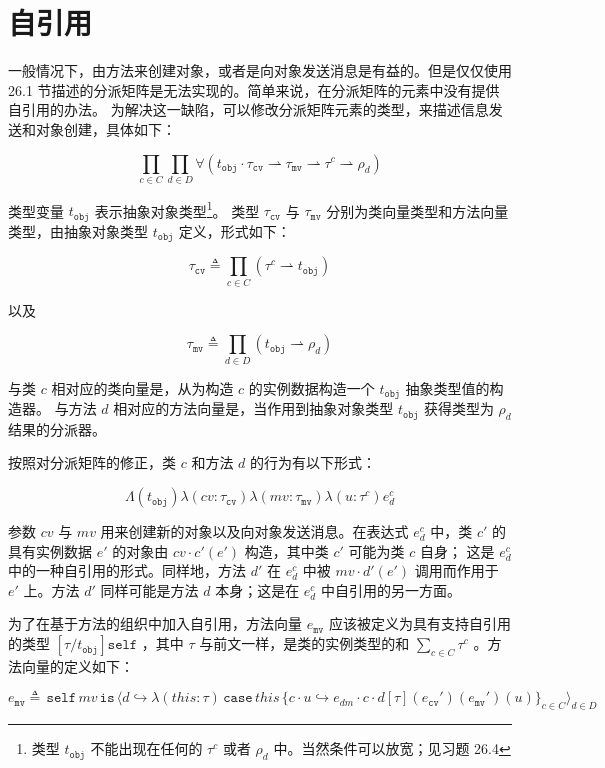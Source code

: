 \section{自引用}

一般情况下，由方法来创建对象，或者是向对象发送消息是有益的。但是仅仅使用 26.1 节描述的分派矩阵是无法实现的。简单来说，在分派矩阵的元素中没有提供自引用的办法。
为解决这一缺陷，可以修改分派矩阵元素的类型，来描述信息发送和对象创建，具体如下：

$$ \prod_{c \in C} \prod_{d \in D} \forall (t_{\mathtt{obj}} \cdot \tau_{\mathtt{cv}} \rightharpoonup \tau_{\mathtt{mv}} \rightharpoonup \tau^{c} \rightharpoonup \rho_{d})$$

类型变量 $t_{\mathtt{obj}}$ 表示抽象对象类型\footnote[2]{类型 $t_{\mathtt{obj}}$ 不能出现在任何的 $\tau^{c}$ 或者 $\rho_{d}$ 中。当然条件可以放宽；见习题 26.4}。
类型 $\tau_{\mathtt{cv}}$ 与 $\tau_{\mathtt{mv}}$ 分别为类向量类型和方法向量类型，由抽象对象类型 $t_{\mathtt{obj}}$ 定义，形式如下：

$$ \tau_{\mathtt{cv}} \triangleq \prod_{c \in C}(\tau^{c} \rightharpoonup t_{\mathtt{obj}}) $$

以及

$$ \tau_{\mathtt{mv}} \triangleq \prod_{d \in D}(t_{\mathtt{obj}} \rightharpoonup \rho_{d}) $$

与类 $c$ 相对应的类向量是，从为构造 $c$ 的实例数据构造一个 $t_{\mathtt{obj}}$ 抽象类型值的构造器。
与方法 $d$ 相对应的方法向量是，当作用到抽象对象类型 $t_{\mathtt{obj}}$ 获得类型为 $\rho_{d}$ 结果的分派器。

按照对分派矩阵的修正，类 $c$ 和方法 $d$ 的行为有以下形式：

$$ \Lambda(t_{\mathtt{obj}})\lambda(cv : \tau_{\mathtt{cv}}) \lambda (mv : \tau_{\mathtt{mv}}) \lambda (u : \tau^{c})e^{c}_{d}$$

参数 $cv$ 与 $mv$ 用来创建新的对象以及向对象发送消息。在表达式 $e^{c}_{d}$ 中，类 $c'$ 的具有实例数据 $e'$ 的对象由 $ cv \cdot c' (e') $ 构造，其中类 $c'$ 可能为类 $c$ 自身；
这是 $e^{c}_{d}$ 中的一种自引用的形式。同样地，方法 $d'$ 在 $e^{c}_{d}$ 中被 $ mv \cdot d'(e') $ 调用而作用于 $e'$ 上。方法 $d'$ 同样可能是方法 $d$ 本身；这是在 $e^{c}_{d}$ 中自引用的另一方面。

为了在基于方法的组织中加入自引用，方法向量 $e_{\mathtt{mv}}$ 应该被定义为具有支持自引用的类型 $[\tau/t_{\mathtt{obj}}] {\mathtt{self}}$ ，其中 $\tau$ 与前文一样，是类的实例类型的和 $\sum_{c \in C} \tau^{c}$ 。方法向量的定义如下：

$$ e_{\mathtt{mv}} \triangleq \, {\mathtt{self}} \, mv \,{\mathtt{is}} \, \langle d \hookrightarrow \lambda(this : \tau) \, {\mathtt{case}} \, this \, \{ c \cdot u \hookrightarrow e_{dm} \cdot c \cdot d[\tau](e_{\mathtt{cv}}')(e_{\mathtt{mv}}')(u)\}_{c \in C} \rangle_{d \in D} $$

